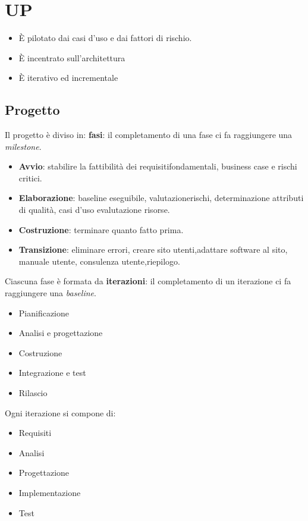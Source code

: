 \documentclass{report}
\begin{document}
\section{UP}
\begin{itemize}
    \item \`E pilotato dai casi d'uso e dai fattori di rischio.
    \item \`E incentrato sull'architettura
    \item \`E iterativo ed incrementale
\end{itemize}

\newpage
\subsection*{Progetto}
Il progetto è diviso in:
\textbf{fasi}: il completamento di una fase ci fa raggiungere una \textit{milestone}.
\begin{itemize}
    \item \textbf{Avvio}: stabilire la fattibilità dei requisitifondamentali, business case e rischi critici.
    \item \textbf{Elaborazione}: baseline eseguibile, valutazionerischi, determinazione attributi di qualità, casi d'uso evalutazione risorse.
    \item \textbf{Costruzione}: terminare quanto fatto prima.
    \item \textbf{Transizione}: eliminare errori, creare sito utenti,adattare software al sito, manuale utente, consulenza utente,riepilogo.
\end{itemize}

\noindent
Ciascuna fase è formata da \textbf{iterazioni}: il completamento di un iterazione ci fa raggiungere una \textit{baseline}.
\begin{itemize}
    \item Pianificazione
    \item Analisi e progettazione
    \item Costruzione
    \item Integrazione e test
    \item Rilascio
\end{itemize}

\noindent
Ogni iterazione si compone di:
\begin{itemize}
    \item Requisiti
    \item Analisi 
    \item Progettazione 
    \item Implementazione 
    \item Test
\end{itemize}
\end{document}
